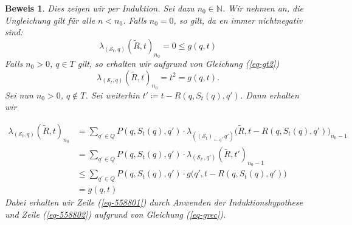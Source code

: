 \documentclass[a4paper]{article}
\newcommand{\mc}{Markow-Kette}
\theoremstyle{nonumberplain}
\newtheorem{beweis}{Beweis}
\begin{document}
\begin{beweis}
		Dies zeigen wir per Induktion. Sei dazu $n_0 \in \mathbb{N}$. Wir nehmen an, die Ungleichung gilt für alle $n<n_0$.
		Falls $n_0 = 0$, so gilt, da \vt{}en immer nichtnegativ sind:
		\[
		\lambda_{(\mathcal{S}_t,q)}(\tilde{R},t)_{n_0} = 0 \leq g(q,t)
		\]
		Falls $n_0 > 0$, $q\in T$ gilt, so erhalten wir aufgrund von Gleichung (\ref{eq-gt2})
		\[
		\lambda_{(\mathcal{S}_t,q)}(\tilde{R},t)_{n_0} = t^2 = g(q,t)\text{.}
		\]
		Sei nun $n_0 > 0$, $q\notin T$. Sei weiterhin $t' \coloneqq t - R(q,S_t(q),q')$. Dann erhalten wir
		
		\begin{align}
		\lambda_{(\mathcal{S}_t,q)}(\tilde{R},t)_{n_0} &= \sum_{q' \in Q} P(q,S_t(q),q') \cdot \lambda_{((\mathcal{S}_t)_{\leftarrow q},q')}\big(\tilde{R},t - R(q,S_t(q),q')\big)_{n_0-1} \\
		&= \sum_{q' \in Q} P(q,S_t(q),q') \cdot \lambda_{(\mathcal{S}_{t'},q')}(\tilde{R},t')_{n_0-1}\\
		&\leq \sum_{q' \in Q} P(q,S_t(q),q') \cdot g\big(q',t -R(q,S_t(q),q')\big) \label{eq-558801}\\
		&= g(q,t) \label{eq-558802}
		\end{align}
		Dabei erhalten wir Zeile (\ref{eq-558801}) durch Anwenden der Induktionshypothese und Zeile (\ref{eq-558802}) aufgrund von Gleichung (\ref{eq-grec}).
		\begin{comment}
		Die resultierende \mc{} $M_{S_t}$, obgleich sie i.A. unendlich sein kann, weist einen eindeutigen \expect{} und eine eindeutige \var{} bezüg\-lich der Kantenbewertung $\tilde{R}$ auf, da letztere beschränkt ist und wir angenommen haben, dass der MDP $M$ unter jedem Scheduler in einer \mc{} resultiert, in der von jedem Zustand ein Zielzustand erreichbar ist. Nach Lemma \ref{lem-vtqf} ist dann auch die \vt{} eindeutig definiert. Die \vt{}en von $M_{S_t}$ berechnen sich insbesondere durch die folgenden Gleichungen:
		\begin{align*}
		\forall & t \in \mathbb{R}, q \notin T : \\
		& \mvt_{(\mathcal{S}_t,q)}(\tilde{R},t) = \sum_{q' \in Q} P(q,S_t(q),q') \cdot \mvt_{((\mathcal{S}_t)_{\leftarrow q},q)}\big(\tilde{R},t - R(q,S_t(q),q')\big) \\
		\forall & t \in \mathbb{R}, q \in T : \\
		& \mvt_{(\mathcal{S}_t,q)}(\tilde{R},t) = t^2
		\end{align*}
		Betrachten wir Gleichung (\ref{eq-grec}), so sehen wir, dass mit $\mvt_{(\mathcal{S}_t,q)}(\tilde{R},t) = g(q,t)$ die Funktion $g$ uns eine Lösung des Gleichungssystems gibt. Des Weiteren beschreiben diese Gleichungen eine Reihe, deren Wert, falls er existiert, eindeutig bestimmt ist. Da die Lösung eindeutig sein muss, gilt die Behauptung.
		\end{comment}
		
	\end{beweis}
\end{document}
